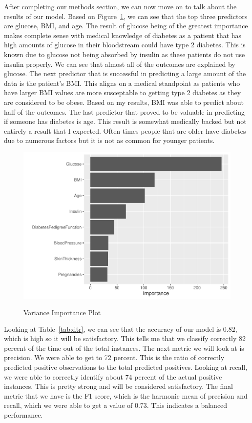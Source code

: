 \documentclass[12pt]{article}
\begin{document}
After completing our methods section, we can now move on to talk about the results of our model. Based on Figure~\ref{fig:importance}, we can 
see that the top three predictors are glucose, BMI, and age. The result of glucose being of the greatest importance makes complete sense with 
medical knowledge of diabetes as a patient that has high amounts of glucose in their bloodstream could have type 2 diabetes. This is known due
to glucose not being absorbed by insulin as these patients do not use insulin properly. We can see that almost all of the outcomes are explained
by glucose. The next predictor that is successful in predicting a large amount of the data is the patient's BMI. This aligns on a medical standpoint
as patients who have larger BMI values are more susceptable to getting type 2 diabetes as they are considered to be obese. Based on my results, BMI
was able to predict about half of the outcomes. The last predictor that proved to be valuable in predicting if someone has diabetes is age. This result
is somewhat medically backed but not entirely a result that I expected. Often times people that are older have diabetes due to numerous factors but it is 
not as common for younger patients.

\begin{figure}[tbp]
  \centering
  \caption{Variance Importance Plot}
  \includegraphics[width=\textwidth]{Variance Important.pdf}
  \label{fig:importance}
\end{figure}

Looking at Table~\ref{tab:dtr}, we can see that the accuracy of our model is 0.82, which is high so it will be satisfactory. This tells me that we 
classify correctly 82 percent of the time out of the total instances. The next metric we will look at is precision. We were able to get to 72 percent.
This is the ratio of correctly predicted positive observations to the total predicted positives. Looking at recall, we were able to correctly identify about
74 percent of the actual positive instances. This is pretty strong and will be considered satisfactory. The final metric that we have is the F1 score, which is the
harmonic mean of precision and recall, which we were able to get a value of 0.73. This indicates a balanced performance.  
\end{document}
